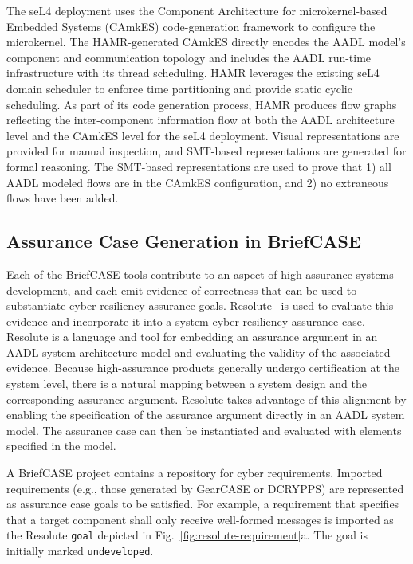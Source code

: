 The seL4 deployment uses the Component Architecture for microkernel-based Embedded Systems (CAmkES) code-generation framework to configure the microkernel. The HAMR-generated CAmkES directly encodes the AADL model’s component and communication topology and includes the AADL run-time infrastructure with its thread scheduling. HAMR leverages the existing seL4 domain scheduler to enforce time partitioning and provide static cyclic scheduling. 
%
As part of its code generation process, HAMR produces flow graphs reflecting the inter-component information flow at both the AADL architecture level and the CAmkES level for the seL4 deployment. Visual representations are provided for manual inspection, and SMT-based representations are generated for formal reasoning. The SMT-based representations are used to prove that 1) all AADL modeled flows are in the CAmkES configuration, and 2) no extraneous flows have been added. 


\subsection{Assurance Case Generation in BriefCASE}
\label{sec:resolute}

Each of the BriefCASE tools contribute to an aspect of high-assurance systems development, and each emit evidence of correctness that can be used to substantiate cyber-resiliency assurance goals. Resolute~\cite{resolute2014} is used to evaluate this evidence and incorporate it into a system cyber-resiliency assurance case. 
%
Resolute is a language and tool for embedding an assurance argument in an AADL system architecture model and evaluating the validity of the associated evidence. 
Because high-assurance products generally undergo certification at the system level, there is a natural mapping between a system design and the corresponding assurance argument. Resolute takes advantage of this alignment by enabling the specification of the assurance argument directly in an AADL system model. The assurance case can then be instantiated and evaluated with elements specified in the model.

A BriefCASE project contains a repository for cyber requirements. Imported requirements (e.g., those generated by GearCASE or DCRYPPS) are represented as assurance case goals to be satisfied. 
For example, a requirement that specifies that a target component shall only receive well-formed messages is imported as the Resolute \texttt{goal} depicted in Fig.~\ref{fig:resolute-requirement}a.  The goal is initially marked \texttt{undeveloped}.

